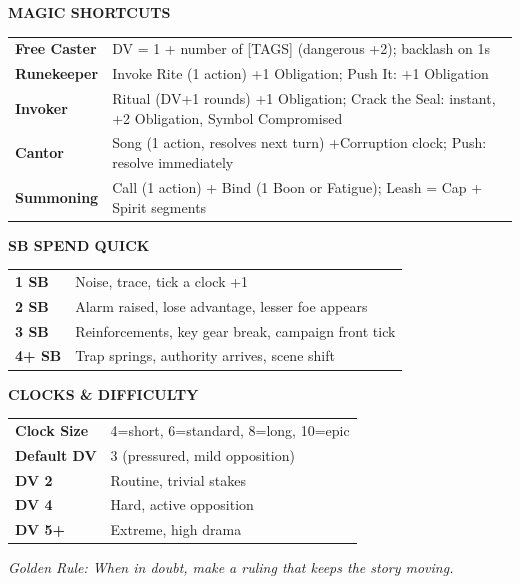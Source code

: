\begin{tcolorbox}[title=\textbf{Fate’s Edge – GM Screen}, colback=blue!5!white, colframe=blue!75!black, sharp corners, fonttitle=\bfseries, center title]
\vspace{0.5em}
\begin{center}
\large\textbf{MAGIC SHORTCUTS}
\end{center}
\begin{tabularx}{\textwidth}{X|X}
\hline
\textbf{Free Caster} & DV = 1 + number of [TAGS] (dangerous +2); backlash on 1s \\
\textbf{Runekeeper} & Invoke Rite (1 action) +1 Obligation; Push It: +1 Obligation \\
\textbf{Invoker} & Ritual (DV+1 rounds) +1 Obligation; Crack the Seal: instant, +2 Obligation, Symbol Compromised \\
\textbf{Cantor} & Song (1 action, resolves next turn) +Corruption clock; Push: resolve immediately \\
\textbf{Summoning} & Call (1 action) + Bind (1 Boon or Fatigue); Leash = Cap + Spirit segments \\
\hline
\end{tabularx}

\vspace{0.5em}
\begin{center}
\large\textbf{SB SPEND QUICK}
\end{center}
\begin{tabularx}{\textwidth}{X|X}
\hline
\textbf{1 SB} & Noise, trace, tick a clock +1 \\
\textbf{2 SB} & Alarm raised, lose advantage, lesser foe appears \\
\textbf{3 SB} & Reinforcements, key gear break, campaign front tick \\
\textbf{4+ SB} & Trap springs, authority arrives, scene shift \\
\hline
\end{tabularx}

\vspace{0.5em}
\begin{center}
\large\textbf{CLOCKS \& DIFFICULTY}
\end{center}
\begin{tabularx}{\textwidth}{X|X}
\hline
\textbf{Clock Size} & 4=short, 6=standard, 8=long, 10=epic \\
\textbf{Default DV} & 3 (pressured, mild opposition) \\
\textbf{DV 2} & Routine, trivial stakes \\
\textbf{DV 4} & Hard, active opposition \\
\textbf{DV 5+} & Extreme, high drama \\
\hline
\end{tabularx}

\vspace{0.5em}
\small\centering \textit{Golden Rule: When in doubt, make a ruling that keeps the story moving.}
\end{tcolorbox}

